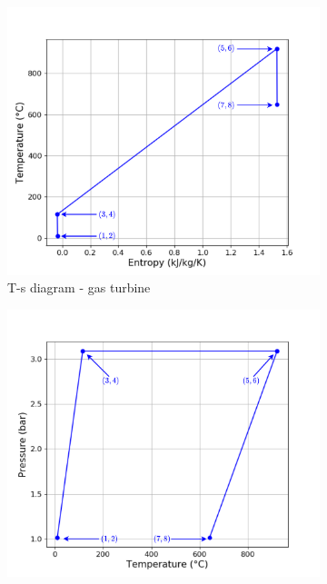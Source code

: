\begin{figure}[h]
     \centering
     \begin{subfigure}[b]{0.3\textwidth}
         \centering
         \includegraphics[width=\textwidth]{Ts_GT}
         \caption{T-s diagram - gas turbine}
         \label{fig:C5_Ts_GT}
     \end{subfigure}
     \begin{subfigure}[b]{0.3\textwidth}
         \centering
         \includegraphics[width=\textwidth]{pT_GT}

\end{subfigure}
\end{figure}
